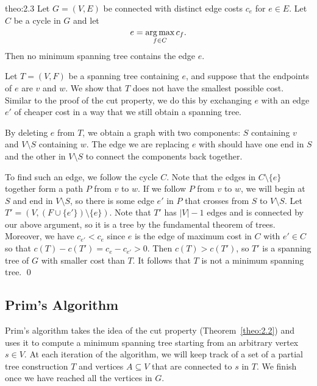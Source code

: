 \begin{theo}{theo:2.3}
    Let $G = (V, E)$ be connected with distinct edge costs 
    $c_e$ for $e \in E$. Let $C$ be a cycle in $G$ and let 
    \[ e = \operatorname*{arg\,max}_{f\in C} c_f. \] 
    Then no minimum spanning tree contains the edge $e$. 
\end{theo}\vspace{-0.25cm}
\begin{pf}
    Let $T = (V, F)$ be a spanning tree containing $e$, 
and suppose that the endpoints of $e$ are $v$ and $w$. We show that $T$ 
does not have the smallest possible cost. Similar to the proof of the 
cut property, we do this by exchanging $e$ with an edge $e'$ 
of cheaper cost in a way that we still obtain a spanning tree. 

By deleting $e$ from $T$, we obtain a graph with two components: $S$ 
containing $v$ and $V \setminus S$ containing $w$. The edge we are 
replacing $e$ with should have one end in $S$ and the other in $V \setminus S$ 
to connect the components back together. 

To find such an edge, we follow the cycle $C$. Note that the edges in 
$C \setminus \{e\}$ together form a path $P$ from $v$ to $w$. If 
we follow $P$ from $v$ to $w$, we will begin at $S$ and end in $V \setminus S$, 
so there is some edge $e'$ in $P$ that crosses from $S$ to $V \setminus S$. 
Let $T' = (V, (F \cup \{e'\}) \setminus \{e\})$. Note that $T'$ 
has $|V| - 1$ edges and is connected by our above argument, so it is a tree 
by the fundamental theorem of trees. Moreover, we have $c_{e'} < c_e$ 
since $e$ is the edge of maximum cost in $C$ with $e' \in C$ so that 
$c(T) - c(T') = c_e - c_{e'} > 0$.
Then $c(T) > c(T')$, so $T'$ is a spanning tree of $G$ with smaller cost 
than $T$. It follows that $T$ is not a minimum spanning tree. \qed
\end{pf}\vspace{-0.25cm}

\subsection{Prim's Algorithm}\label{subsec:2.3}
Prim's algorithm takes the idea of the cut property (Theorem~\ref{theo:2.2}) 
and uses it to compute a minimum spanning tree starting from an arbitrary 
vertex $s \in V$. At each iteration of the algorithm, we will keep track of a 
set of a partial tree construction $T$ and vertices $A \subseteq V$ that are 
connected to $s$ in $T$. We finish once we have reached all the vertices in $G$.


